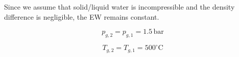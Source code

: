Since we assume that solid/liquid water is incompressible and the density difference is negligible, the EW remains constant.  

\[ p_{g,2} = p_{g,1} = 1.5 \, \text{bar} \]  

\[ T_{g,2} = T_{g,1} = 500^\circ \text{C} \]